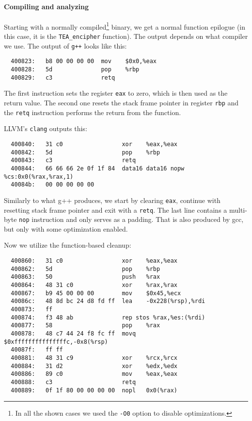 \documentclass[a4paper,10pt,openright]{memoir}
\newcommand{\code}[1]{\texttt{#1}}
\begin{document}
\paragraph{Compiling and analyzing}

Starting with a normally compiled\footnote{In all the shown cases we 
used the \code{-O0} option to disable optimizations.} binary, we get a 
normal function epilogue (in this case, it is the \code{TEA\_encipher} 
function). The output depends on what compiler we use. The output of 
\code{g++} looks like this:


\begin{verbatim}
  400823:   b8 00 00 00 00  mov    $0x0,%eax
  400828:   5d              pop    %rbp
  400829:   c3              retq
\end{verbatim}

The first instruction sets the register \code{eax} to zero, which is 
then used as the return value. The second one resets the stack frame 
pointer in register \code{rbp} and the \code{retq} instruction performs 
the return from the function.

LLVM's \code{clang} outputs this:

\begin{verbatim}
  400840:   31 c0                 xor    %eax,%eax
  400842:   5d                    pop    %rbp
  400843:   c3                    retq   
  400844:   66 66 66 2e 0f 1f 84  data16 data16 nopw %cs:0x0(%rax,%rax,1)
  40084b:   00 00 00 00 00 
\end{verbatim}

Similarly to what g++ produces, we start by clearing \code{eax}, 
continue with resetting stack frame pointer and exit with a 
\code{retq}. The last line contains a multi-byte \code{nop} instruction 
and only serves as a padding. That is also produced by gcc, but only 
with some optimization enabled.


Now we utilize the function-based cleanup:

\begin{verbatim}
  400860:   31 c0                 xor    %eax,%eax
  400862:   5d                    pop    %rbp
  400863:   50                    push   %rax
  400864:   48 31 c0              xor    %rax,%rax
  400867:   b9 45 00 00 00        mov    $0x45,%ecx
  40086c:   48 8d bc 24 d8 fd ff  lea    -0x228(%rsp),%rdi
  400873:   ff 
  400874:   f3 48 ab              rep stos %rax,%es:(%rdi)
  400877:   58                    pop    %rax
  400878:   48 c7 44 24 f8 fc ff  movq   $0xfffffffffffffffc,-0x8(%rsp)
  40087f:   ff ff 
  400881:   48 31 c9              xor    %rcx,%rcx
  400884:   31 d2                 xor    %edx,%edx
  400886:   89 c0                 mov    %eax,%eax
  400888:   c3                    retq   
  400889:   0f 1f 80 00 00 00 00  nopl   0x0(%rax)
\end{verbatim}
\end{document}
